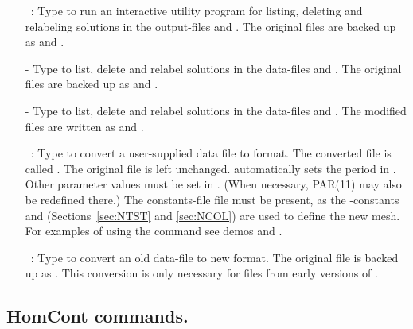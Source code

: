 \begin{itemize}
\item[\commandf{@lb}]~:
  Type  to run an interactive utility program
  for listing, deleting and relabeling solutions 
  in the output-files  and .
  The original files are backed up as
 and . 
  \item[-]
  Type  to list, delete and relabel solutions
  in the data-files  and .
  The original files are backed up as  and . 
\item[-]
  Type  to list, delete and relabel solutions
  in the data-files  and .
  The modified files are written as  and . 

\item[\commandf{@fc}]~:
  Type  to convert a user-supplied data file 
  to \AUTO format. The converted file is called .
  The original file is left unchanged.
  \AUTO automatically sets the period in .
  Other parameter values must be set in . (When necessary,
  PAR(11) may also be redefined there.) 
  The constants-file file  must be present, as the 
  \AUTO-constants  and  
  (Sections~\ref{sec:NTST} and \ref{sec:NCOL}) are used to define the new mesh.
  For examples of using the  command see demos  and .

\item[\commandf{@94to97}]~:
  Type  to convert an old \AUTOolder data-file 
  to new \AUTOold format. The original file is backed up as .
  This conversion is only necessary for files from early versions 
  of \AUTOolder.
\end{itemize}

\subsection{ HomCont commands.} 

